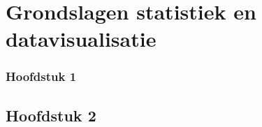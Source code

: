 \chapter{Grondslagen statistiek en datavisualisatie}

\subsection*{Hoofdstuk 1}




% 
% 
% 







\section*{Hoofdstuk 2}


% 







